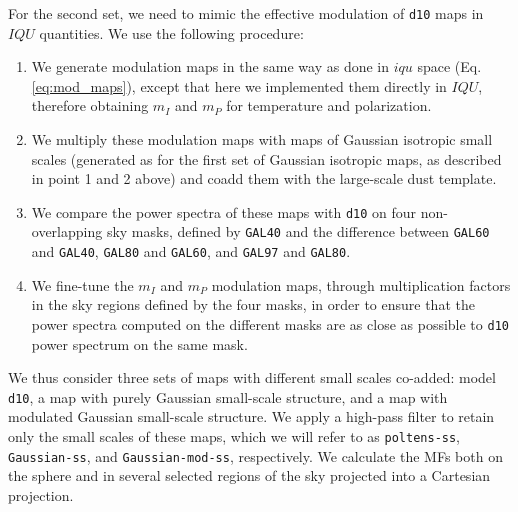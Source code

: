 \documentclass[twocolumn]{aastex631}
\begin{document}
For the second set, we need to mimic the effective modulation of \texttt{d10} maps in $IQU$ quantities. We use the following procedure:
\begin{enumerate}
\item We generate modulation maps in the same way as done in $iqu$ space (Eq. \ref{eq:mod_maps}), except that here we implemented them directly in $IQU$, therefore obtaining $m_I$ and $m_P$ for temperature and polarization.

\item We multiply these modulation maps with maps of Gaussian isotropic small scales (generated as for the first set of Gaussian isotropic maps, as described in point 1 and 2 above) and coadd them with the large-scale dust template.

\item We compare the power spectra of these maps with \texttt{d10} on four non-overlapping sky masks, defined by \texttt{GAL40} and the difference between \texttt{GAL60} and \texttt{GAL40}, \texttt{GAL80} and \texttt{GAL60}, and \texttt{GAL97} and \texttt{GAL80}. 

\item{We fine-tune the $m_I$ and $m_P$ modulation maps, through multiplication factors in the sky regions defined by the four masks, in order to ensure that the power spectra computed on the different masks are as close as possible to \texttt{d10} power spectrum on the same mask. %
}
\end{enumerate}


We thus consider three sets of maps with different small scales co-added: model \texttt{d10}, a map with purely Gaussian small-scale structure, and a map with modulated Gaussian small-scale structure. %
We apply a high-pass filter to retain only the small scales of these maps, which we will refer to as \texttt{poltens-ss}, \texttt{Gaussian-ss}, and \texttt{Gaussian-mod-ss}, respectively. We calculate the MFs both on the sphere and in several selected regions of the sky projected into a Cartesian projection. 

\end{document}
